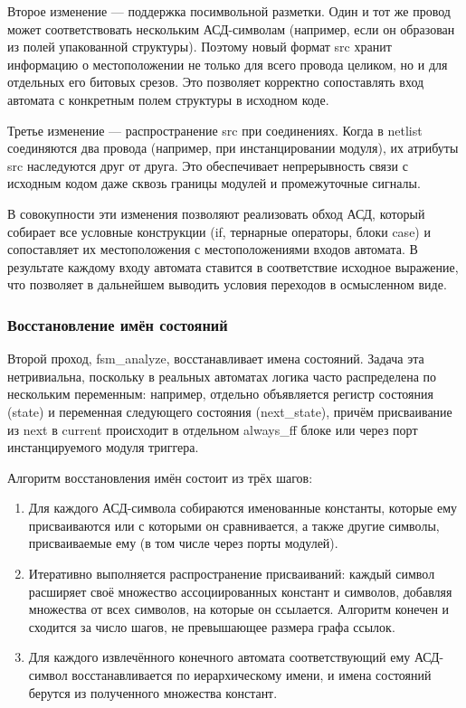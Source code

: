 Второе изменение — поддержка посимвольной разметки. Один и тот же провод может соответствовать
нескольким АСД-символам (например, если он образован из полей упакованной структуры).
Поэтому новый формат src хранит информацию о местоположении не только для всего провода
целиком, но и для отдельных его битовых срезов. Это позволяет корректно сопоставлять вход
автомата с конкретным полем структуры в исходном коде.

Третье изменение — распространение src при соединениях. Когда в netlist соединяются два провода
(например, при инстанцировании модуля), их атрибуты src наследуются друг от друга. Это
обеспечивает непрерывность связи с исходным кодом даже сквозь границы модулей и
промежуточные сигналы.

В совокупности эти изменения позволяют реализовать обход АСД, который собирает все условные
конструкции (if, тернарные операторы, блоки case) и сопоставляет их местоположения с
местоположениями входов автомата. В результате каждому входу автомата ставится в соответствие
исходное выражение, что позволяет в дальнейшем выводить условия переходов в осмысленном виде.

\subsubsection{Восстановление имён состояний}

Второй проход, fsm\_analyze, восстанавливает имена состояний. Задача эта нетривиальна, поскольку
в реальных автоматах логика часто распределена по нескольким переменным: например, отдельно
объявляется регистр состояния (state) и переменная следующего состояния (next\_state), причём
присваивание из next в current происходит в отдельном always\_ff блоке или через порт
инстанцируемого модуля триггера.

Алгоритм восстановления имён состоит из трёх шагов:

\begin{enumerate}
\item Для каждого АСД-символа собираются именованные константы, которые ему присваиваются или
с которыми он сравнивается, а также другие символы, присваиваемые ему (в том числе через порты
модулей).

\item Итеративно выполняется распространение присваиваний: каждый символ расширяет своё множество
ассоциированных констант и символов, добавляя множества от всех символов, на которые он ссылается.
Алгоритм конечен и сходится за число шагов, не превышающее размера графа ссылок.

\item Для каждого извлечённого конечного автомата соответствующий ему АСД-символ восстанавливается
по иерархическому имени, и имена состояний берутся из полученного множества констант.
\end{enumerate}

